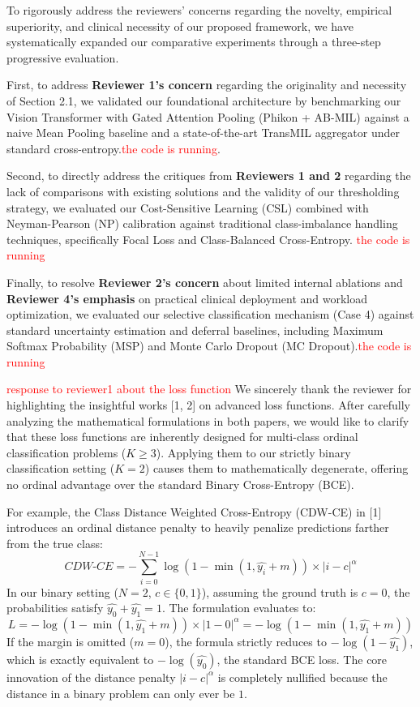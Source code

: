 \documentclass[UTF8,12pt]{article}
\begin{document}
To rigorously address the reviewers' concerns regarding the novelty, empirical superiority, and clinical necessity of our proposed framework, we have systematically expanded our comparative experiments through a three-step progressive evaluation. 

First, to address \textbf{Reviewer 1's concern} regarding the originality and necessity of Section 2.1, we validated our foundational architecture by benchmarking our Vision Transformer with Gated Attention Pooling (Phikon + AB-MIL) against a naive Mean Pooling baseline and a state-of-the-art TransMIL aggregator under standard cross-entropy.\textcolor{red}{the code is running}.

Second, to directly address the critiques from \textbf{Reviewers 1 and 2} regarding the lack of comparisons with existing solutions and the validity of our thresholding strategy, we evaluated our Cost-Sensitive Learning (CSL) combined with Neyman-Pearson (NP) calibration against traditional class-imbalance handling techniques, specifically Focal Loss and Class-Balanced Cross-Entropy. \textcolor{red}{the code is running}

Finally, to resolve \textbf{Reviewer 2's concern} about limited internal ablations and \textbf{Reviewer 4's emphasis} on practical clinical deployment and workload optimization, we evaluated our selective classification mechanism (Case 4) against standard uncertainty estimation and deferral baselines, including Maximum Softmax Probability (MSP) and Monte Carlo Dropout (MC Dropout).\textcolor{red}{the code is running}

\textcolor{red}{response to reviewer1 about the loss function}
We sincerely thank the reviewer for highlighting the insightful works [1, 2] on advanced loss functions. After carefully analyzing the mathematical formulations in both papers, we would like to clarify that these loss functions are inherently designed for multi-class ordinal classification problems ($K \ge 3$). Applying them to our strictly binary classification setting ($K=2$) causes them to mathematically degenerate, offering no ordinal advantage over the standard Binary Cross-Entropy (BCE). 

For example, the Class Distance Weighted Cross-Entropy (CDW-CE) in [1] introduces an ordinal distance penalty to heavily penalize predictions farther from the true class:
$$CDW\text{-}CE = - \sum_{i=0}^{N-1} \log(1 - \min(1, \widehat{y_i} + m)) \times |i - c|^\alpha$$
In our binary setting ($N=2$, $c \in \{0, 1\}$), assuming the ground truth is $c=0$, the probabilities satisfy $\widehat{y_0} + \widehat{y_1} = 1$. The formulation evaluates to:
$$L = - \log(1 - \min(1, \widehat{y_1} + m)) \times |1 - 0|^\alpha = - \log(1 - \min(1, \widehat{y_1} + m))$$
If the margin is omitted ($m=0$), the formula strictly reduces to $- \log(1 - \widehat{y_1})$, which is exactly equivalent to $-\log(\widehat{y_0})$, the standard BCE loss. The core innovation of the distance penalty $|i - c|^\alpha$ is completely nullified because the distance in a binary problem can only ever be $1$. 
\end{document}
